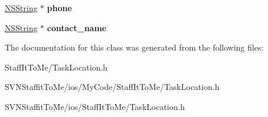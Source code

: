 \begin{DoxyCompactItemize}
\item 
\hypertarget{interface_task_location_a9028e4fc54d378ca949de60f0399c862}{
\hyperlink{class_n_s_string}{\-N\-S\-String} $\ast$ {\bfseries phone}}
\label{interface_task_location_a9028e4fc54d378ca949de60f0399c862}

\item 
\hypertarget{interface_task_location_a2eb3ca52d2071ca0316ed59daa5bb056}{
\hyperlink{class_n_s_string}{\-N\-S\-String} $\ast$ {\bfseries contact\-\_\-name}}
\label{interface_task_location_a2eb3ca52d2071ca0316ed59daa5bb056}

\end{DoxyCompactItemize}


\-The documentation for this class was generated from the following files\-:\begin{DoxyCompactItemize}
\item 
\-Staff\-It\-To\-Me/\-Task\-Location.\-h\item 
\-S\-V\-N\-Staffit\-To\-Me/ios/\-My\-Code/\-Staff\-It\-To\-Me/\-Task\-Location.\-h\item 
\-S\-V\-N\-Staffit\-To\-Me/ios/\-Staff\-It\-To\-Me/\-Task\-Location.\-h\end{DoxyCompactItemize}
